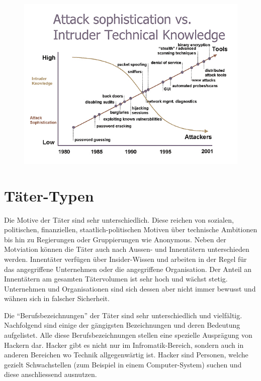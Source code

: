 \begin{figure}[t]
  \centering
  \includegraphics[width=12cm]{./images/AttackKnowledgeChart}
\end{figure}


\section{Täter-Typen}
Die Motive der Täter sind sehr unterschiedlich. Diese reichen von sozialen, politischen, finanziellen, staatlich-politischen Motiven über technische Ambitionen bis hin zu Regierungen oder Gruppierungen wie Anonymous. Neben der Motviation können die Täter auch nach Aussen- und Innentätern unterschieden werden. Innentäter verfügen über Insider-Wissen und arbeiten in der Regel für das angegriffene Unternehmen oder die angegriffene Organisation. Der Anteil an Innentätern am gesamten Tätervolumen ist sehr hoch und wächst stetig. Unternehmen und Organisationen sind sich dessen aber nicht immer bewusst und wähnen sich in falscher Sicherheit.

Die "`Berufsbezeichnungen"' der Täter sind sehr unterschiedlich und vielfältig. Nachfolgend sind einige der gängigsten Bezeichnungen und deren Bedeutung aufgelistet. Alle diese Berufsbezeichnungen stellen eine spezielle Ausprägung von Hackern dar. Hacker gibt es nicht nur im Infromatik-Bereich, sondern auch in anderen Bereichen wo Technik allgegenwärtig ist. Hacker sind Personen, welche gezielt Schwachstellen (zum Beispiel in einem Computer-System) suchen und diese anschliessend ausnutzen. 

